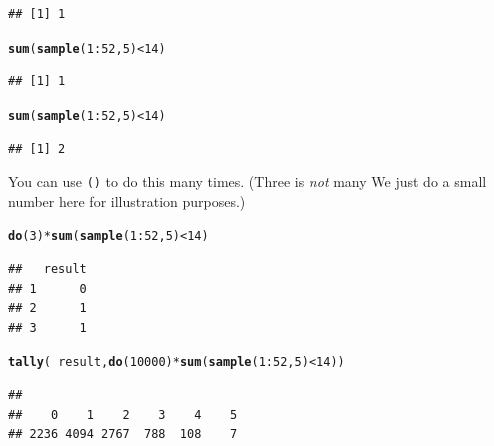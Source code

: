 \documentclass[twoside]{book}\usepackage[]{graphicx}\usepackage[]{xcolor}
\makeatletter
\newcommand{\hlnum}[1]{\textcolor[rgb]{0.686,0.059,0.569}{#1}}%
\newcommand{\hlopt}[1]{\textcolor[rgb]{0,0,0}{#1}}%
\newcommand{\hlstd}[1]{\textcolor[rgb]{0.345,0.345,0.345}{#1}}%
\newcommand{\hlkwd}[1]{\textcolor[rgb]{0.737,0.353,0.396}{\textbf{#1}}}%
\newenvironment{kframe}{%
 \def\at@end@of@kframe{}%
 \ifinner\ifhmode%
  \def\at@end@of@kframe{\end{minipage}}%
  \begin{minipage}{\columnwidth}%
 \fi\fi%
 \def\FrameCommand##1{\hskip\@totalleftmargin \hskip-\fboxsep
 \colorbox{shadecolor}{##1}\hskip-\fboxsep
     \hskip-\linewidth \hskip-\@totalleftmargin \hskip\columnwidth}%
 \MakeFramed {\advance\hsize-\width
   \@totalleftmargin\z@ \linewidth\hsize
   \@setminipage}}%
 {\par\unskip\endMakeFramed%
 \at@end@of@kframe}
\newenvironment{knitrout}{}{} %
\newcommand{\Rindex}[1]{\index{\texttt{#1}}}
\newcommand{\function}[1]{{\color{purple!75!blue}\texttt{\StrSubstitute{#1}{()}{}()}}\Rindex{#1}}
\makeatother
\begin{document}
\begin{problem}
\begin{knitrout}
\begin{kframe}
\begin{alltt}
\end{alltt}
\begin{verbatim}
## [1] 1
\end{verbatim}
\begin{alltt}
\hlkwd{sum}\hlstd{(}\hlkwd{sample}\hlstd{(}\hlnum{1}\hlopt{:}\hlnum{52}\hlstd{,} \hlnum{5}\hlstd{)} \hlopt{<} \hlnum{14}\hlstd{)}
\end{alltt}
\begin{verbatim}
## [1] 1
\end{verbatim}
\begin{alltt}
\hlkwd{sum}\hlstd{(}\hlkwd{sample}\hlstd{(}\hlnum{1}\hlopt{:}\hlnum{52}\hlstd{,} \hlnum{5}\hlstd{)} \hlopt{<} \hlnum{14}\hlstd{)}
\end{alltt}
\begin{verbatim}
## [1] 2
\end{verbatim}
\end{kframe}
\end{knitrout}
	You can use \function{do()} to do this many times. (Three is \emph{not} many\! We just do a small number here 
	for illustration purposes.)
\begin{knitrout}
\color{fgcolor}\begin{kframe}
\begin{alltt}
\hlkwd{do}\hlstd{(}\hlnum{3}\hlstd{)} \hlopt{*} \hlkwd{sum}\hlstd{(}\hlkwd{sample}\hlstd{(}\hlnum{1}\hlopt{:}\hlnum{52}\hlstd{,} \hlnum{5}\hlstd{)} \hlopt{<} \hlnum{14}\hlstd{)}
\end{alltt}
\begin{verbatim}
##   result
## 1      0
## 2      1
## 3      1
\end{verbatim}
\end{kframe}
\end{knitrout}
\end{problem}

\begin{solution}
\begin{knitrout}
\color{fgcolor}\begin{kframe}
\begin{alltt}
\hlkwd{tally}\hlstd{(}\hlopt{~}\hlstd{result,} \hlkwd{do}\hlstd{(}\hlnum{10000}\hlstd{)} \hlopt{*} \hlkwd{sum}\hlstd{(}\hlkwd{sample}\hlstd{(}\hlnum{1}\hlopt{:}\hlnum{52}\hlstd{,} \hlnum{5}\hlstd{)} \hlopt{<} \hlnum{14}\hlstd{))}
\end{alltt}
\begin{verbatim}
## 
##    0    1    2    3    4    5 
## 2236 4094 2767  788  108    7
\end{verbatim}
\end{kframe}
\end{knitrout}
\end{solution}
\end{document}

